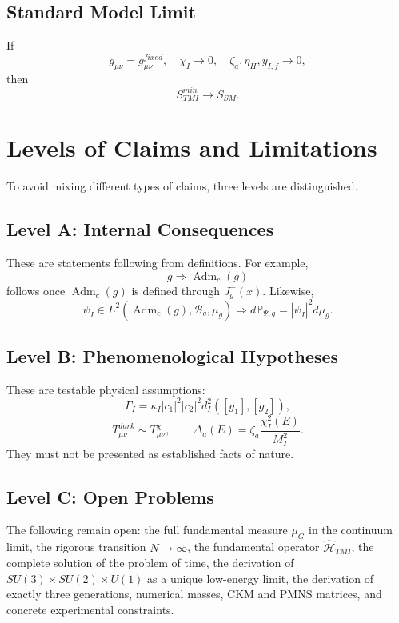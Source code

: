 \documentclass[12pt,a4paper]{article}
\DeclareMathOperator{\Adm}{Adm}
\newcommand{\Prob}{\mathbb P}
\begin{document}
\subsection{Standard Model Limit}
If
\[
\boxed{g_{\mu\nu}=g_{\mu\nu}^{fixed},\quad \chi_I\to0,
\quad \zeta_a,\eta_H,y_{I,f}\to0,}
\]
then
\[
\boxed{S_{TMI}^{min}\to S_{SM}.}
\]

\section{Levels of Claims and Limitations}
To avoid mixing different types of claims, three levels are distinguished.

\subsection{Level A: Internal Consequences}
These are statements following from definitions. For example,
\[
\boxed{g\Rightarrow\Adm_c(g)}
\]
follows once $\Adm_c(g)$ is defined through $J_g^+(x)$. Likewise,
\[
\boxed{\psi_I\in L^2(\Adm_c(g),\mathcal B_g,\mu_g)
\Rightarrow d\Prob_{\Psi,g}=|\psi_I|^2d\mu_g.}
\]

\subsection{Level B: Phenomenological Hypotheses}
These are testable physical assumptions:
\[
\boxed{\Gamma_I=\kappa_I|c_1|^2|c_2|^2d_I^2([g_1],[g_2]),}
\]
\[
\boxed{T_{\mu\nu}^{dark}\sim T_{\mu\nu}^{\chi},}
\qquad
\boxed{\Delta_a(E)=\zeta_a\frac{\chi_I^2(E)}{M_I^2}.}
\]
They must not be presented as established facts of nature.

\subsection{Level C: Open Problems}
The following remain open: the full fundamental measure $\mu_G$ in the continuum limit, the rigorous transition $N\to\infty$, the fundamental operator $\widehat{\mathcal H}_{TMI}$, the complete solution of the problem of time, the derivation of $SU(3)\times SU(2)\times U(1)$ as a unique low-energy limit, the derivation of exactly three generations, numerical masses, CKM and PMNS matrices, and concrete experimental constraints.
\end{document}
